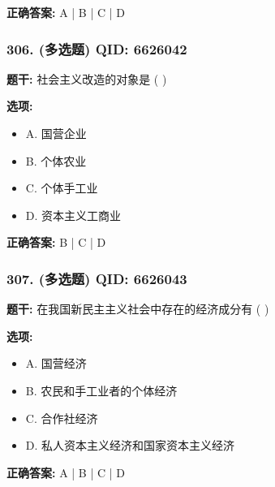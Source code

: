 \documentclass[12pt,UTF8]{ctexart}
\begin{document}
\textbf{正确答案:}
A | B | C | D

\vspace{0.3em}\hrulefill\vspace{0.7em}

\subsubsection*{306. (多选题) \small QID: 6626042}

\textbf{题干:}
社会主义改造的对象是  ( )

\textbf{选项:}
\begin{itemize}[leftmargin=*]

  \item A. 国营企业

  \item B. 个体农业

  \item C. 个体手工业

  \item D. 资本主义工商业

\end{itemize}

\textbf{正确答案:}
B | C | D

\vspace{0.3em}\hrulefill\vspace{0.7em}

\subsubsection*{307. (多选题) \small QID: 6626043}

\textbf{题干:}
在我国新民主主义社会中存在的经济成分有  ( )

\textbf{选项:}
\begin{itemize}[leftmargin=*]

  \item A. 国营经济

  \item B. 农民和手工业者的个体经济

  \item C. 合作社经济

  \item D. 私人资本主义经济和国家资本主义经济

\end{itemize}

\textbf{正确答案:}
A | B | C | D

\vspace{0.3em}\hrulefill\vspace{0.7em}
\end{document}
